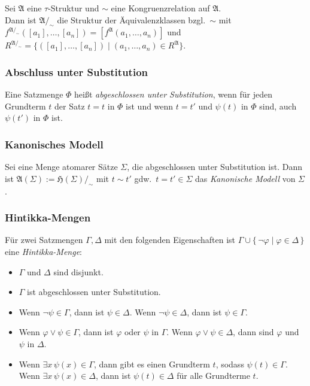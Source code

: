 \documentclass[a4paper,parskip=half*,DIV=15,fontsize=11pt]{scrartcl}
\newcommand{\A}{\mathfrak{A}}
\newcommand{\He}{\mathfrak{H}}
\begin{document}
Sei $\A$ eine $\tau$-Struktur und $\sim$ eine Kongruenzrelation auf $\A$.   \\
Dann ist $\A /_{\sim}$ die Struktur der Äquivalenzklassen bzgl.\ $\sim$ mit $f^{\A /_{\sim}}([a_1],\ldots, [a_n]) = [f^\A(a_1,\ldots,a_n)]$ und $R^{\A/_{\sim}} = \{([a_1],\ldots,[a_n]) \;|\; (a_1,\ldots,a_n) \in R^\A\}$.

\subsubsection{Abschluss unter Substitution}

Eine Satzmenge $\Phi$ heißt \emph{abgeschlossen unter Substitution}, wenn für jeden Grundterm $t$ der Satz $t = t$ in $\Phi$ ist und wenn $t = t'$ und $\psi(t)$ in $\Phi$ sind, auch $\psi(t')$ in $\Phi$ ist.

\subsubsection{Kanonisches Modell}

Sei eine Menge atomarer Sätze $\Sigma$, die abgeschlossen unter Substitution ist. Dann ist $\A(\Sigma) := \He(\Sigma)/_{\sim}$ mit $t \sim t'$ gdw.\ $t = t' \in \Sigma$ das \emph{Kanonische Modell} von $\Sigma$.

\subsubsection{Hintikka-Mengen}

Für zwei Satzmengen $\Gamma, \Delta$ mit den folgenden Eigenschaften ist $\Gamma \cup \{\,\neg \varphi \;|\; \varphi \in \Delta\,\}$ eine \emph{Hintikka-Menge}:
\begin{itemize}
\item $\Gamma$ und $\Delta$ sind disjunkt.
\item $\Gamma$ ist abgeschlossen unter Substitution.
\item Wenn $\neg \psi \in \Gamma$, dann ist $\psi \in \Delta$. Wenn $\neg \psi \in \Delta$, dann ist $\psi \in \Gamma$.
\item Wenn $\varphi \lor \psi \in \Gamma$, dann ist $\varphi$ oder $\psi$ in $\Gamma$. Wenn $\varphi \lor \psi \in \Delta$, dann sind $\varphi$ und $\psi$ in $\Delta$.
\item Wenn $\exists x\, \psi(x) \in \Gamma$, dann gibt es einen Grundterm $t$, sodass $\psi(t) \in \Gamma$. Wenn $\exists x\, \psi(x) \in \Delta$, dann ist $\psi(t) \in \Delta$ für alle Grundterme $t$.
\end{itemize}
\end{document}
